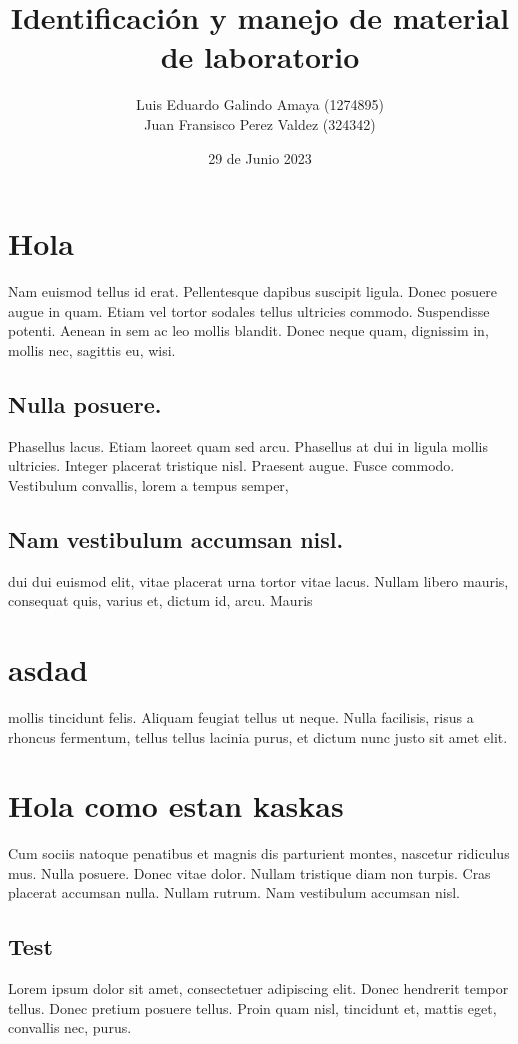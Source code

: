 \documentclass[11pt]{article}
\author{Luis Eduardo Galindo Amaya (1274895) \\
Juan Fransisco Perez Valdez  (324342)}
\date{29 de Junio 2023}
\title{Identificación y manejo de material de laboratorio}
\begin{document}
\modentitlepage
\pagebreak
\tableofcontents
\pagebreak
{}
\pagebreak

\section{Hola}
\label{sec:orgbd5cfde}
Nam euismod tellus id erat.  Pellentesque dapibus suscipit ligula.  
Donec posuere augue in quam.  Etiam vel tortor sodales tellus ultricies
commodo.  Suspendisse potenti.  Aenean in sem ac leo mollis blandit.  
Donec neque quam, dignissim in, mollis nec, sagittis eu, wisi.  

\subsection{Nulla posuere.}
\label{sec:orgb2b908b}
Phasellus lacus.  Etiam laoreet quam sed arcu.  Phasellus at dui in 
ligula mollis ultricies.  Integer placerat tristique nisl.  Praesent 
augue.  Fusce commodo.  Vestibulum convallis, lorem a tempus semper, 

\subsection{Nam vestibulum accumsan nisl.}
\label{sec:orgb4ce9b0}
dui dui euismod elit, vitae placerat urna tortor vitae lacus.  Nullam 
libero mauris, consequat quis, varius et, dictum id, arcu.  Mauris 

\section{asdad}
\label{sec:org189ac81}
mollis tincidunt felis.  Aliquam feugiat tellus ut neque.  Nulla 
facilisis, risus a rhoncus fermentum, tellus tellus lacinia purus, et 
dictum nunc justo sit amet elit.

\section{Hola como estan kaskas}
\label{sec:org1a26ca5}
Cum sociis 
natoque penatibus et magnis dis parturient montes, nascetur ridiculus 
mus.  Nulla posuere.  Donec vitae dolor.  Nullam tristique diam non 
turpis.  Cras placerat accumsan nulla.  Nullam rutrum.  Nam vestibulum
accumsan nisl.

\subsection{Test}
\label{sec:org7886534}
Lorem ipsum dolor sit amet, consectetuer adipiscing elit.  Donec 
hendrerit tempor tellus.  Donec pretium posuere tellus.  Proin quam 
nisl, tincidunt et, mattis eget, convallis nec, purus.  
\end{document}
